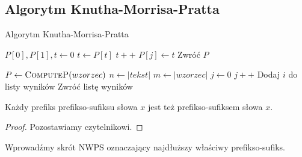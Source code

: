 \subsection{Algorytm Knutha-Morrisa-Pratta}

\begin{algorithm}[H]
	\caption{Algorytm Knutha-Morrisa-Pratta}
	\label{KMP}
	\begin{algorithmic}[1]
		\State $P[0], P[1], t \gets 0$
		\State $t \gets P[t]$
		\EndWhile
		\State $t++$
		\EndIf
		\State $P[j] \gets t$
		\EndFor
		\State Zwróć $P$
		\EndProcedure
		
		\State $P \gets \textsc{ComputeP}(wzorzec)$
		\State $n \gets |tekst|$
		\State $m \gets |wzorzec|$
		\State $j \gets 0$
				\State $j++$
			\EndWhile
				\State Dodaj $i$ do listy wyników
			\EndIf
		\EndFor
		\State Zwróć listę wyników
		\EndProcedure		
	\end{algorithmic}
\end{algorithm}

\begin{fact}
	\label{prefiksosufiks}
	Każdy prefiks prefikso-sufiksu słowa $x$ jest też prefikso-sufiksem słowa $x$.
	\begin{proof}
		Pozostawiamy czytelnikowi.
	\end{proof}
\end{fact}

Wprowadźmy skrót NWPS oznaczający najdłuższy właściwy prefikso-sufiks.

